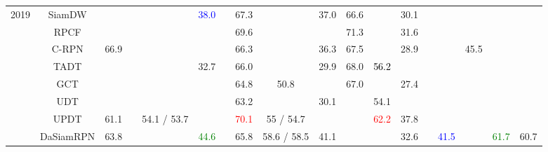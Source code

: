 \documentclass[10pt,twocolumn,letterpaper]{article}
\begin{document}
\begin{table*}[t]
\begin{tabular}{cccccccccccccccccc}
2019 & SiamDW \cite{Zhang19CVPR} &  &  &  & \textcolor{blue}{38.0} &  & 67.3 &  & 37.0 & 66.6 &  & 30.1 &  &  &  &  & \tabularnewline
\cmidrule{2-18} \cmidrule{3-18} \cmidrule{4-18} \cmidrule{5-18} \cmidrule{6-18} \cmidrule{7-18} \cmidrule{8-18} \cmidrule{9-18} \cmidrule{10-18} \cmidrule{11-18} \cmidrule{12-18} \cmidrule{13-18} \cmidrule{14-18} \cmidrule{15-18} \cmidrule{16-18} \cmidrule{17-18} \cmidrule{18-18} 
 & RPCF \cite{Sun19CVPR} &  &  &  &  &  & 69.6 &  &  & 71.3 &  & 31.6 &  &  &  &  & \tabularnewline
\cmidrule{2-18} \cmidrule{3-18} \cmidrule{4-18} \cmidrule{5-18} \cmidrule{6-18} \cmidrule{7-18} \cmidrule{8-18} \cmidrule{9-18} \cmidrule{10-18} \cmidrule{11-18} \cmidrule{12-18} \cmidrule{13-18} \cmidrule{14-18} \cmidrule{15-18} \cmidrule{16-18} \cmidrule{17-18} \cmidrule{18-18} 
 & C-RPN \cite{Fan19CVPRCRPN} & 66.9 &  &  &  &  & 66.3 &  & 36.3 & 67.5 &  & 28.9 &  &  & 45.5 &  & \tabularnewline
\cmidrule{2-18} \cmidrule{3-18} \cmidrule{4-18} \cmidrule{5-18} \cmidrule{6-18} \cmidrule{7-18} \cmidrule{8-18} \cmidrule{9-18} \cmidrule{10-18} \cmidrule{11-18} \cmidrule{12-18} \cmidrule{13-18} \cmidrule{14-18} \cmidrule{15-18} \cmidrule{16-18} \cmidrule{17-18} \cmidrule{18-18} 
 & TADT \cite{Li19CVPR_TargetAware} &  &  &  & 32.7 &  & 66.0 &  & 29.9 & 68.0 & \textcolor{black}{56.2} &  &  &  &  &  & \tabularnewline
\cmidrule{2-18} \cmidrule{3-18} \cmidrule{4-18} \cmidrule{5-18} \cmidrule{6-18} \cmidrule{7-18} \cmidrule{8-18} \cmidrule{9-18} \cmidrule{10-18} \cmidrule{11-18} \cmidrule{12-18} \cmidrule{13-18} \cmidrule{14-18} \cmidrule{15-18} \cmidrule{16-18} \cmidrule{17-18} \cmidrule{18-18} 
 & GCT \cite{Gao19CVPR} &  &  &  &  &  & 64.8 & 50.8 &  & 67.0 &  & 27.4 &  &  &  &  & \tabularnewline
\cmidrule{2-18} \cmidrule{3-18} \cmidrule{4-18} \cmidrule{5-18} \cmidrule{6-18} \cmidrule{7-18} \cmidrule{8-18} \cmidrule{9-18} \cmidrule{10-18} \cmidrule{11-18} \cmidrule{12-18} \cmidrule{13-18} \cmidrule{14-18} \cmidrule{15-18} \cmidrule{16-18} \cmidrule{17-18} \cmidrule{18-18} 
 & UDT \cite{Wang19CVPR_DeepTracking} &  &  &  &  &  & 63.2 &  & 30.1 &  & 54.1 &  &  &  &  &  & \tabularnewline
\midrule
 & UPDT \cite{Bhat18ECCV} & 61.1 &  & 54.1 / 53.7 &  &  & \textcolor{red}{70.1} & 55 / 54.7 &  &  & \textcolor{red}{62.2} & 37.8 &  &  &  &  & \tabularnewline
\cmidrule{2-18} \cmidrule{3-18} \cmidrule{4-18} \cmidrule{5-18} \cmidrule{6-18} \cmidrule{7-18} \cmidrule{8-18} \cmidrule{9-18} \cmidrule{10-18} \cmidrule{11-18} \cmidrule{12-18} \cmidrule{13-18} \cmidrule{14-18} \cmidrule{15-18} \cmidrule{16-18} \cmidrule{17-18} \cmidrule{18-18} 
 & DaSiamRPN \cite{Zhu18ECCV} & 63.8 &  &  & \textcolor{green}{44.6} &  & 65.8 & 58.6 / 58.5 & 41.1 &  &  & 32.6 &  & \textcolor{blue}{41.5} &  & \textcolor{green}{61.7} & 60.7\tabularnewline

\end{tabular}
\end{table*}
\end{document}
